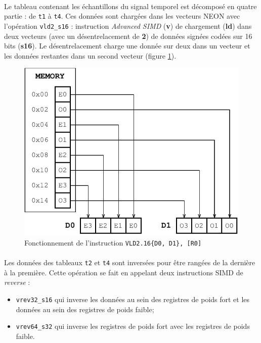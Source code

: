 \documentclass{article}
\begin{document}
    \paragraph{}
    Le tableau contenant les échantillons du signal temporel est décomposé en quatre partie : de \texttt{t1} à \texttt{t4}. Ces données sont chargées dans les vecteurs NEON avec l'opération \texttt{vld2\_s16} : instruction \emph{Advanced SIMD} (\textbf{v}) de chargement (\textbf{ld}) dans deux vecteurs (avec un désentrelacement de \textbf{2}) de données signées codées sur 16 bits (\textbf{s16}). Le désentrelacement charge une donnée sur deux dans un vecteur et les données restantes dans un second vecteur (figure \ref{fig:vld2_s16})\cite{tuto-neon}.
    \begin{figure}[H]
        \centering
        \includegraphics[width=.6\linewidth]{./images/vld2_s16.pdf}
        \caption{Fonctionnement de l'instruction \texttt{VLD2.16\{D0, D1\}, [R0]}}
        \label{fig:vld2_s16}
    \end{figure}

    \paragraph{}
    Les données des tableaux \texttt{t2} et \texttt{t4} sont inversées pour être rangées de la dernière à la première. Cette opération se fait en appelant deux instructions SIMD de \emph{reverse} :
    \begin{itemize}
        \item \texttt{vrev32\_s16} qui inverse les données au sein des registres de poids fort et les données au sein des registres de poids faible;
        \item \texttt{vrev64\_s32} qui inverse les registres de poids fort avec les registres de poids faible.
    \end{itemize}
\end{document}
